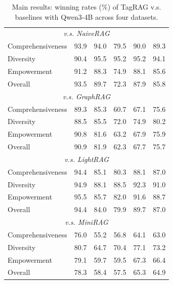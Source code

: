 \documentclass[11pt]{article}
\begin{document}
\begin{table}[t!]
\begin{tabularx}{0.48\textwidth}{lXXXXX}
\rowcolor{gray!20} 
\multicolumn{6}{c}{\textbf{Retrieval-Augmented Generation}}\\ \midrule
\multicolumn{6}{c}{\textit{v.s. NaiveRAG}}\\ \midrule
Comprehensiveness & 93.9 & 94.0 & 79.5 & 90.0 & 89.3 \\
Diversity         & 90.4 & 95.5 & 95.2 & 95.2 & 94.1 \\
Empowerment       & 91.2 & 88.3 & 74.9 & 88.1 & 85.6 \\
Overall           & 93.5 & 89.7 & 72.3 & 87.9 & 85.8 \\ \midrule
\multicolumn{6}{c}{\textit{v.s. GraphRAG}}\\ \midrule
Comprehensiveness & 89.3 & 85.3 & 60.7 & 67.1 & 75.6 \\
Diversity         & 88.5 & 85.5 & 72.0 & 74.9 & 80.2 \\
Empowerment       & 90.8 & 81.6 & 63.2 & 67.9 & 75.9 \\
Overall           & 90.9 & 81.9 & 62.3 & 67.7 & 75.7 \\ \midrule
\multicolumn{6}{c}{\textit{v.s. LightRAG}}\\ \midrule
Comprehensiveness & 94.4 & 85.1 & 80.3 & 88.1 & 87.0 \\
Diversity         & 94.9 & 88.1 & 88.5 & 92.3 & 91.0 \\
Empowerment       & 95.5 & 85.7 & 82.0 & 91.6 & 88.7 \\
Overall           & 94.4 & 84.0 & 79.9 & 89.7 & 87.0 \\ \midrule
\multicolumn{6}{c}{\textit{v.s. MiniRAG}}\\ \midrule
Comprehensiveness & 76.0 & 55.2 & 56.8 & 64.1 & 63.0 \\
Diversity         & 80.7 & 64.7 & 70.4 & 77.1 & 73.2 \\
Empowerment       & 79.1 & 59.7 & 59.5 & 67.3 & 66.4 \\
Overall           & 78.3 & 58.4 & 57.5 & 65.3 & 64.9 \\
\bottomrule
\end{tabularx}
\caption{Main results: winning rates (\%) of TagRAG v.s. baselines with Qwen3-4B across four datasets.}
\label{tab:main results}
\end{table}
\end{document}
